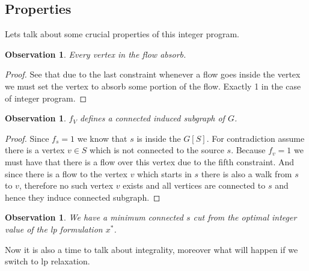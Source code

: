 \documentclass{article}
\theoremstyle{plain}
\newtheorem{observ}[thm]{Observation}
\theoremstyle{plain}
\theoremstyle{remark}
\begin{document}
	\subsection{Properties}
	
	Lets talk about some crucial properties of this integer program.
	
	\begin{observ}
		Every vertex in the flow absorb.
	\end{observ}

	\begin{proof}
		See that due to the last constraint whenever a flow goes inside the vertex we must set the vertex to absorb some portion of the flow. Exactly 1 in the case of integer program.
	\end{proof}

	\begin{observ}
		$f_V$ defines a connected induced subgraph of $G$.
	\end{observ}

	\begin{proof}
		Since $f_s = 1$ we know that $s$ is inside the $G[S]$. For contradiction assume there is a vertex $v \in S$ which is not connected to the source $s$. Because $f_v = 1$ we must have that there is a flow over this vertex due to the fifth constraint. And since there is a flow to the vertex $v$ which starts in $s$ there is also a walk from $s$ to $v$, therefore no such vertex $v$ exists and all vertices are connected to $s$ and hence they induce connected subgraph.
	\end{proof}

	\begin{observ}
		We have a minimum connected $s$ cut from the optimal integer value of the lp formulation $x^\ast$.
	\end{observ}

	Now it is also a time to talk about integrality, moreover what will happen if we switch to lp relaxation.
	
\end{document}
